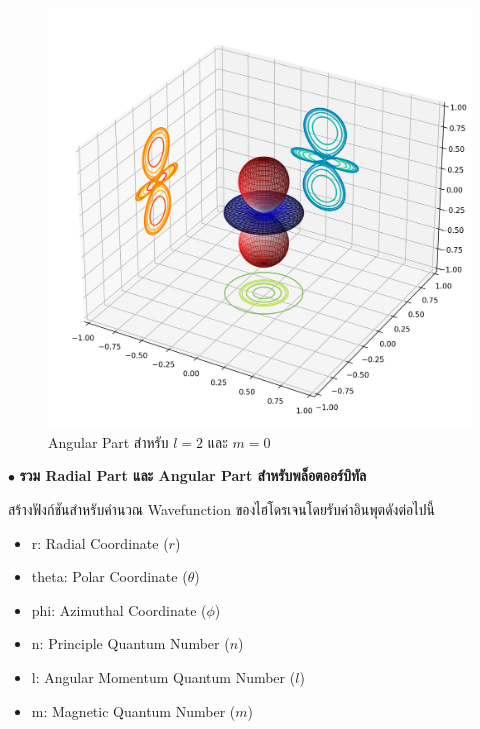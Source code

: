 \begin{figure}[H]
    \centering
    \includegraphics[width=0.9\linewidth]{fig/wfn_hydro_angular.png}
    \caption{Angular Part สำหรับ $l = 2$ และ $m = 0$}
    \label{fig:wfn_hydro_angular}
\end{figure}

\bigskip

$\bullet$ \textbf{รวม Radial Part และ Angular Part สำหรับพล็อตออร์บิทัล}

สร้างฟังก์ชันสำหรับคำนวณ Wavefunction ของไฮโดรเจนโดยรับค่าอินพุตดังต่อไปนี้ 

\begin{itemize}[topsep=0pt,noitemsep]
    \item r: Radial Coordinate ($r$)
    
    \item theta: Polar Coordinate ($\theta$)
    
    \item phi: Azimuthal Coordinate ($\phi$)
    
    \item n: Principle Quantum Number ($n$)
    
    \item l: Angular Momentum Quantum Number ($l$)
    
    \item m: Magnetic Quantum Number ($m$)
\end{itemize}

